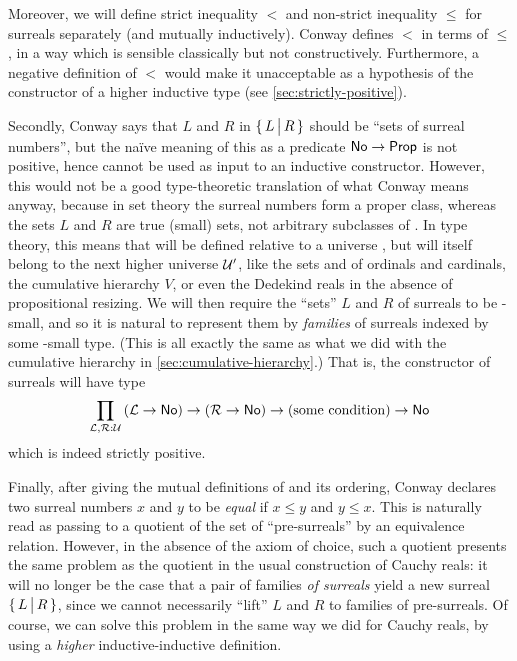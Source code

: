 Moreover, we will define strict inequality $<$ and non-strict inequality $\le$ for surreals separately (and mutually inductively).
Conway defines $<$ in terms of $\le$, in a way which is sensible classically but not constructively.
%
Furthermore, a negative definition of $<$ would make it unacceptable as a hypothesis of the constructor of a higher inductive type (see \autoref{sec:strictly-positive}).

Secondly, Conway says that $L$ and $R$ in $\{\,L\,\big|\,R\,\}$ should be ``sets of surreal numbers'', but the na\"ive meaning of this as a predicate $\mathsf{No}\to\mathsf{Prop}$ is not positive, hence cannot be used as input to an inductive constructor.
However, this would not be a good type-theoretic translation of what Conway means anyway, because in set theory the surreal numbers form a proper class, whereas the sets $L$ and $R$ are true (small) sets, not arbitrary subclasses of \NO.
In type theory, this means that \NO will be defined relative to a universe \UU, but will itself belong to the next higher universe $\mathcal{U}'$, like the sets \ord and \card of ordinals and cardinals, the cumulative hierarchy $V$, or even the Dedekind reals in the absence of propositional resizing.
%
We will then require the ``sets'' $L$ and $R$ of surreals to be \UU-small, and so it is natural to represent them by \emph{families} of surreals indexed by some \UU-small type.
(This is all exactly the same as what we did with the cumulative hierarchy in \autoref{sec:cumulative-hierarchy}.)
That is, the constructor of surreals will have type
\[ \prd{\LL,\RR:\UU} (\LL\to\NO) \to (\RR\to \NO) \to (\text{some condition}) \to \NO \]
which is indeed strictly positive.

Finally, after giving the mutual definitions of \NO and its ordering, Conway declares two surreal numbers $x$ and $y$ to be \emph{equal} if $x\le y$ and $y\le x$.
This is naturally read as passing to a quotient of the set of ``pre-surreals'' by an equivalence relation.
However, in the absence of the axiom of choice, such a quotient presents the same problem as the quotient in the usual construction of Cauchy reals: it will no longer be the case that a pair of families \emph{of surreals} yield a new surreal $\{\,L\,\big|\,R\,\}$, since we cannot necessarily ``lift'' $L$ and $R$ to families of pre-surreals.
Of course, we can solve this problem in the same way we did for Cauchy reals, by using a \emph{higher} inductive-inductive definition.

